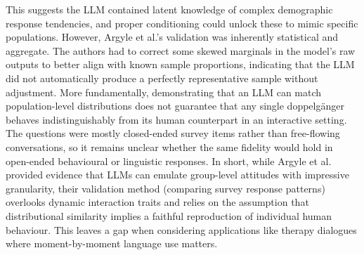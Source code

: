 This suggests the LLM contained latent knowledge of complex demographic response tendencies, and proper conditioning could unlock these to mimic specific populations. However, Argyle et al.’s validation was inherently statistical and aggregate. The authors had to correct some skewed marginals in the model’s raw outputs to better align with known sample proportions, indicating that the LLM did not automatically produce a perfectly representative sample without adjustment. More fundamentally, demonstrating that an LLM can match population-level distributions does not guarantee that any single doppelgänger behaves indistinguishably from its human counterpart in an interactive setting. The questions were mostly closed-ended survey items rather than free-flowing conversations, so it remains unclear whether the same fidelity would hold in open-ended behavioural or linguistic responses. In short, while Argyle et al. provided evidence that LLMs can emulate group-level attitudes with impressive granularity, their validation method (comparing survey response patterns) overlooks dynamic interaction traits and relies on the assumption that distributional similarity implies a faithful reproduction of individual human behaviour. This leaves a gap when considering applications like therapy dialogues where moment-by-moment language use matters.



